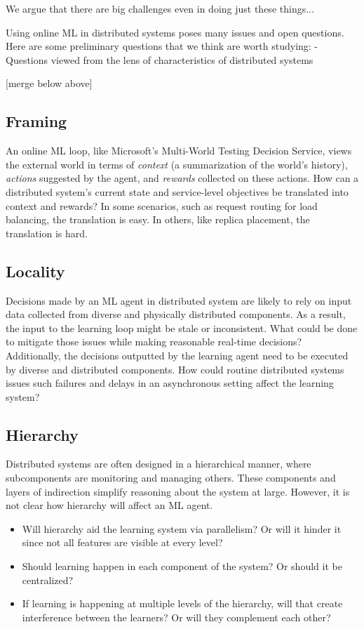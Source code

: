 \documentclass[a4paper,twocolumn]{article}
\begin{document}
We argue that there are big challenges even in doing just these things...

Using online ML in distributed systems poses many issues and open questions.
Here are some preliminary questions that we think are worth studying:
- Questions viewed from the lens of characteristics of distributed systems

[merge below above]

\subsection*{Framing}
An online ML loop, like Microsoft's Multi-World Testing Decision Service, views
the external world in terms of \emph{context} (a summarization of the world's
history), \emph{actions} suggested by the agent, and \emph{rewards} collected on
these actions. How can a distributed system's current state and service-level
objectives be translated into context and rewards? In some scenarios, such as
request routing for load balancing, the translation is easy. In others, like
replica placement, the translation is hard.

\subsection*{Locality}
Decisions made by an ML agent in distributed system are likely to rely on input
data collected from diverse and physically distributed components. As a result,
the input to the learning loop might be stale or inconsistent. What could be
done to mitigate those issues while making reasonable real-time decisions?
Additionally, the decisions outputted by the learning agent need to be executed
by diverse and distributed components. How could routine distributed systems
issues such failures and delays in an asynchronous setting affect the learning
system?


\subsection*{Hierarchy}
Distributed systems are often designed in a hierarchical manner, where
subcomponents are monitoring and managing others. These components and layers of
indirection simplify reasoning about the system at large. However, it is not
clear how hierarchy will affect an ML agent.
\begin{itemize}
  \item Will hierarchy aid the learning system via parallelism? Or will it hinder
    it since not all features are visible at every level?
  \item Should learning happen in each component of the system? Or should it be
    centralized?
  \item If learning is happening at multiple levels of the hierarchy, will that
    create interference between the learners? Or will they complement each
    other?
\end{itemize}
\end{document}
